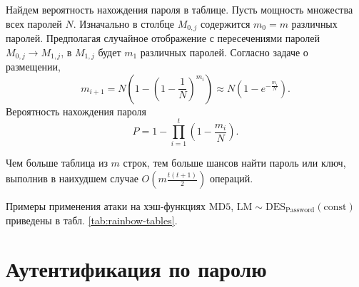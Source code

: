 \documentclass[10pt,a4paper]{book}
\begin{document}
Найдем вероятность нахождения пароля в таблице. Пусть мощность множества всех паролей $N$. Изначально в столбце $M_{0,j}$ содержится $m_0 = m$ различных паролей. Предполагая случайное отображение с пересечениями паролей $M_{0,j} \rightarrow M_{1,j}$, в $M_{1,j}$ будет $m_1$ различных паролей. Согласно задаче о размещении,
\[
    m_{i+1} = N \left( 1 - \left( 1 - \frac{1}{N} \right)^{m_i} \right) \approx N \left( 1 - e^{-\frac{m_i}{N}} \right).
\]
Вероятность нахождения пароля
\[
    P = 1 - \prod \limits_{i=1}^t \left( 1 - \frac{m_i}{N} \right).
\]

Чем больше таблица из $m$ строк, тем больше шансов найти пароль или ключ, выполнив в наихудшем случае   $O \left( m \frac{t(t+1)}{2} \right)$ операций.

Примеры применения атаки на хэш-функциях $\textrm{MD5}$, $\textrm{LM} \sim \textrm{DES}_{\textrm{Password}} (\textrm{const})$ приведены в табл. \ref{tab:rainbow-tables}.

\begin{table}[h!]
    \centering
    \caption{Атаки на радужных таблицах на \emph{одном} ПК\label{tab:rainbow-tables}}
\end{table}


\section{Аутентификация по паролю}
\end{document}
